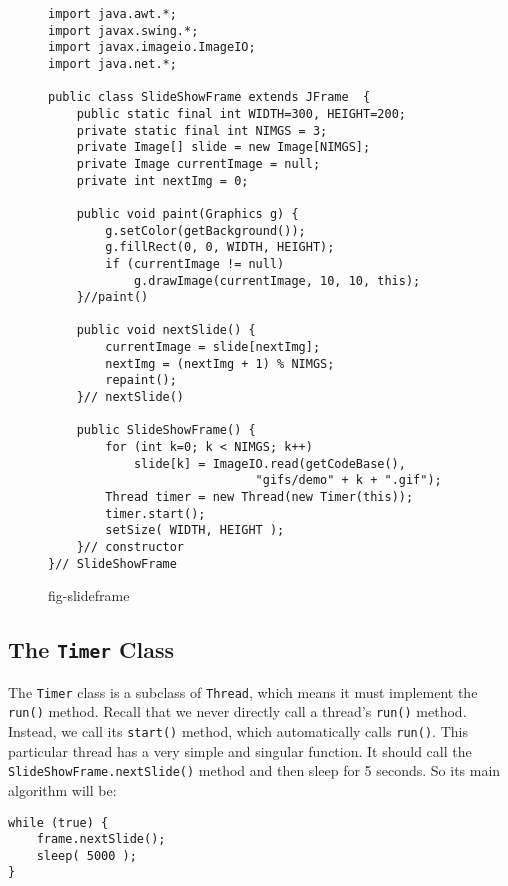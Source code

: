 \begin{figure}[h]
\jjjprogstart
\begin{jjjlisting}
\begin{lstlisting}
import java.awt.*;
import javax.swing.*;
import javax.imageio.ImageIO;
import java.net.*;

public class SlideShowFrame extends JFrame  {
    public static final int WIDTH=300, HEIGHT=200;
    private static final int NIMGS = 3;
    private Image[] slide = new Image[NIMGS];
    private Image currentImage = null;
    private int nextImg = 0;

    public void paint(Graphics g) {
        g.setColor(getBackground());
        g.fillRect(0, 0, WIDTH, HEIGHT);
        if (currentImage != null)
            g.drawImage(currentImage, 10, 10, this);
    }//paint()

    public void nextSlide() {
        currentImage = slide[nextImg];
        nextImg = (nextImg + 1) % NIMGS;
        repaint();
    }// nextSlide()

    public SlideShowFrame() {
        for (int k=0; k < NIMGS; k++) 
            slide[k] = ImageIO.read(getCodeBase(), 
                             "gifs/demo" + k + ".gif");
        Thread timer = new Thread(new Timer(this));
        timer.start();
        setSize( WIDTH, HEIGHT );
    }// constructor
}// SlideShowFrame
\end{lstlisting}
\end{jjjlisting}
{fig-slideframe}
\end{figure}

\subsection{The {\tt Timer} Class}
\noindent The {\tt Timer} class is a subclass of {\tt Thread}, which means it
must implement the {\tt run()} method.   Recall that we never directly
call a thread's {\tt run()} method.  Instead, we call its {\tt start()}
method, which automatically calls {\tt run()}.  This particular thread
has a very simple and singular function.  It should call the
{\tt SlideShowFrame.nextSlide()} method and then sleep for 5 seconds.
So its main algorithm will be:

\begin{jjjlisting}
\begin{lstlisting}
while (true) {
    frame.nextSlide();
    sleep( 5000 );
}
\end{lstlisting}
\end{jjjlisting}

